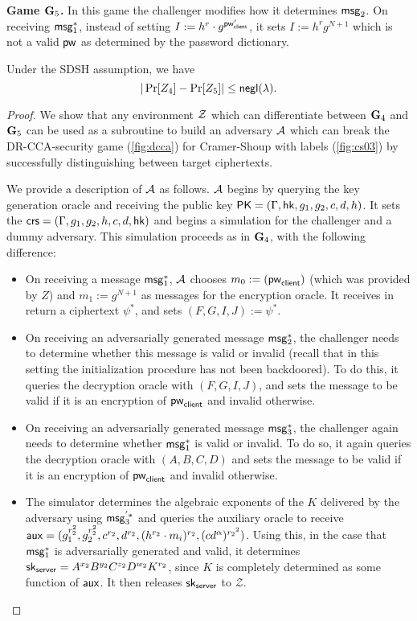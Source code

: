 \textbf{Game $\mathbf{G}_5$.} In this game the challenger modifies how it determines $\mathsf{msg}_{2}$. On receiving $\mathsf{msg}_{1}^{*}$, instead of setting $I:=h^r\cdot g^{\mathsf{pw}_{\mathsf{client}}'}$, it sets $I:=h^rg^{N+1}$ which is not a valid $\mathsf{pw}$ as determined by the password dictionary. 

\begin{lemma}
	Under the SDSH assumption, we have $$|\Pr[Z_4]-\Pr[Z_5]|\leq\mathsf{negl}(\lambda).$$
\end{lemma}
\begin{proof}
	We show that any environment $\mathcal{Z}$ which can differentiate between $\mathbf{G}_4$ and $\mathbf{G}_5$ can be used as a subroutine to build an adversary $\mathcal{A}$ which can break the DR-CCA-security game (\cref{fig:dcca}) for Cramer-Shoup with labels (\cref{fig:cs03}) by successfully distinguishing between target ciphertexts. 
	
	We provide a description of $\mathcal{A}$ as follows. $\mathcal{A}$ begins by querying the key generation oracle and receiving the public key $\mathsf{PK} = (\Gamma,\mathsf{hk},g_1,g_2,c,d,h)$. It sets the $\mathsf{crs} = (\Gamma,g_1,g_2,h,c,d,\mathsf{hk})$ and begins a simulation for the challenger and a dummy adversary. This simulation proceeds as in $\mathbf{G}_4$, with the following difference:
	
	\begin{itemize}
		\item On receiving a message $\mathsf{msg}_{1}^{*}$, $\mathcal{A}$ chooses $m_0:=(\mathsf{pw}_{\mathsf{client}})$ (which was provided by $Z$) and $m_1:=g^{N+1}$ as messages for the encryption oracle. It receives in return a ciphertext $\psi^{*}$, and sets $(F,G,I,J):=\psi^{*}$.
		\item On receiving an adversarially generated message $\mathsf{msg}_{2}^{*}$, the challenger needs to determine whether this message is valid or invalid (recall that in this setting the initialization procedure has not been backdoored). To do this, it queries the decryption oracle with $(F,G,I,J)$, and sets the message to be valid if it is an encryption of $\mathsf{pw}_{\mathsf{client}}$ and invalid otherwise.
		\item On receiving an adversarially generated message $\mathsf{msg}_{3}^{*}$, the challenger again needs to determine whether $\mathsf{msg}_{1}^{*}$ is valid or invalid. To do so, it again queries the decryption oracle with $(A,B,C,D)$ and sets the message to be valid if it is an encryption of $\mathsf{pw}_{\mathsf{client}}$ and invalid otherwise.
		\item The simulator determines the algebraic exponents of the $K$ delivered by the adversary using $\mathsf{msg}_{3}^{'*}$ and queries the auxiliary oracle to receive $\mathsf{aux} = (g_1^{r_2^2}, g_2^{r_2^2}, c^{r_2}, d^{r_2},(h^{r_2}\cdot m_i)^{r_2},(cd^{\alpha})^{{r_2}^2})$. Using this, in the case that $\mathsf{msg}_{1}^{*}$ is adversarially generated and valid, it determines $\mathsf{sk}_{\mathsf{server}} = A^{x_2}B^{y_2}C^{z_2}D^{w_2}K^{r_2}$, since $K$ is completely determined as some function of $\mathsf{aux}$. It then releases $\mathsf{sk}_{\mathsf{server}}$ to $\mathcal{Z}$.
	\end{itemize}


\end{proof}
